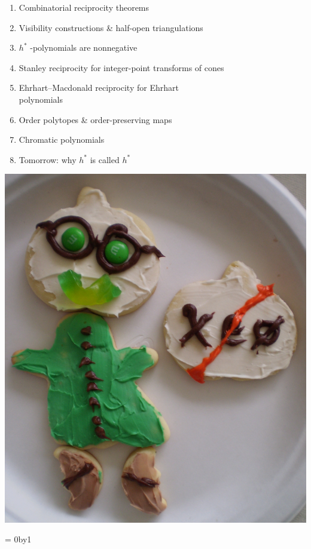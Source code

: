 \documentclass[landscape]{foils}
\def\mybullet{\green $\blacktriangleright$ \black}
\newcounter{frozenpage}
\def\thawpage{
  \count0=\thefrozenpage
  \advance\count0by1
  \renewcommand{\thepage}{\the\count0}
}
\def\green{\color{green}}
\def\blue{\color{blue}}
\def\black{\color{black}}
\def\bm{\blue $}
\def\em{$ \black }
\begin{document}
\vspace{-.5in}
\begin{enumerate}[\mybullet]
\item Combinatorial reciprocity theorems 
\item Visibility constructions \& half-open triangulations
\item \bm h^* \em\!\!-polynomials are nonnegative
\item Stanley reciprocity for integer-point transforms of cones
\item Ehrhart--Macdonald reciprocity for Ehrhart \\ polynomials
\item Order polytopes \& order-preserving maps
\item Chromatic polynomials
\item Tomorrow: why \bm h^* \em is called \bm h^* \em
\end{enumerate}

\vspace{-3.3in}
\hspace{6in}
\includegraphics[totalheight=3.3in]{matzecookie.jpg}

\thawpage
\end{document}
